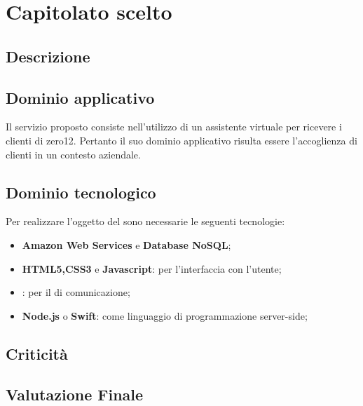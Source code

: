 \section {Capitolato scelto}
	\subsection {Descrizione}
		\SCOPO
	\subsection {Dominio applicativo}
Il servizio proposto consiste nell'utilizzo di un assistente virtuale per ricevere i clienti di zero12. Pertanto il suo dominio applicativo risulta essere l'accoglienza di clienti in un contesto aziendale.
	\subsection {Dominio tecnologico}
		Per realizzare l'oggetto del  sono necessarie le seguenti tecnologie:
		\begin {itemize}
			\item \textbf{Amazon Web Services} e \textbf{Database NoSQL};
			\item \textbf{HTML5,CSS3} e \textbf{Javascript}: per l'interfaccia con l'utente;
			\item \textbf{}: per il  di comunicazione;
			\item \textbf{Node.js} o \textbf{Swift}: come linguaggio di programmazione server-side;

		\end {itemize}
	\subsection {Criticità}
	\subsection {Valutazione Finale}